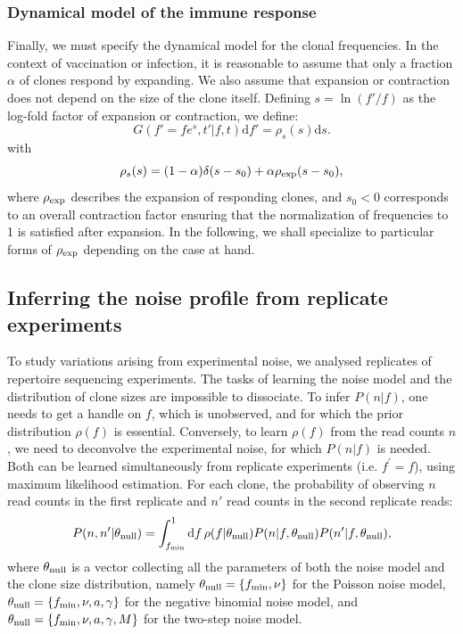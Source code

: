 \documentclass[pre,twocolumn,english,longbibliography]{revtex4}
\newcommand{\beq}{\begin{equation}}
\newcommand{\eeq}{\end{equation}}
\newcommand{\<}{\langle}
\renewcommand{\>}{\rangle}
\begin{document}
\subsubsection*{Dynamical model of the immune response}
Finally, we must specify the dynamical model for the clonal frequencies. In the context of vaccination or infection, it is reasonable to assume that only a fraction $\alpha$ of clones respond by expanding. We also assume that expansion or contraction does not depend on the size of the clone itself. Defining $s=\ln(f'/f)$ as the log-fold factor of expansion or contraction, we define:
\beq
G(f'=fe^s,t'|f,t)\textrm{d}f'=\rho_s(s)\textrm{d}s.
\eeq
with
\beq\label{eq:exp}
\rho_s(s)= (1-\alpha)\delta(s-s_0)+\alpha \rho_{\rm exp}(s-s_0),
\eeq
where $\rho_{\rm exp}$ describes the expansion of responding clones, and $s_0<0$ corresponds to an overall contraction factor ensuring that the normalization of frequencies to 1 is satisfied after expansion. In the following, we shall specialize to particular forms of $\rho_{\rm exp}$ depending on the case at hand.


\subsection*{Inferring the noise profile from replicate experiments} 

To study variations arising from experimental noise, we analysed replicates of repertoire sequencing experiments. The tasks of learning the noise model and the distribution of clone sizes are impossible to dissociate. To infer $P(n|f)$, one needs to get a handle on $f$, which is unobserved, and for which the prior distribution $\rho(f)$ is essential. Conversely, to learn $\rho(f)$ from the read counts $n$, we need to deconvolve the experimental noise, for which $P(n|f)$ is needed. Both can be learned simultaneously from replicate experiments (i.e. $f^\prime=f$), using maximum likelihood estimation. For each clone, the probability of observing $n$ read counts in the first replicate and $n'$ read counts in the second replicate reads:
\beq\label{eq:null}
P(n,n'|\theta_{\rm null})=\int_{f_{\rm min}}^1 \textrm{d}f\, \rho(f|\theta_{\rm null}) P(n|f,\theta_{\rm null})P(n'|f,\theta_{\rm null}),
\eeq
where $\theta_{\rm null}$ is a vector collecting all the parameters of both the noise model and the clone size distribution, namely $\theta_{\rm null}=\{f_{\rm min},\nu\}$ for the Poisson noise model, $\theta_{\rm null}=\{f_{\rm min},\nu,a,\gamma\}$ for the negative binomial noise model, and $\theta_{\rm null}=\{f_{\rm min},\nu,a,\gamma,M\}$ for the two-step noise model.
\end{document}
